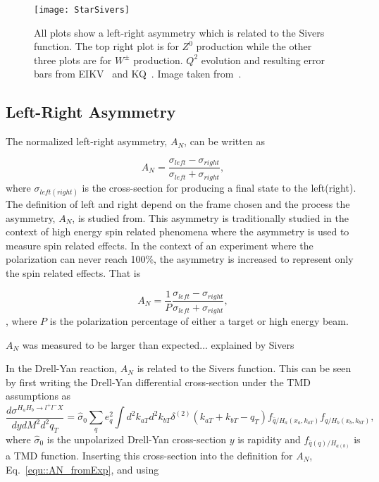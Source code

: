 \begin{figure}[h!t]
  \centering
  \texttt{[image: StarSivers]}
  \caption{All plots show a left-right asymmetry which is related to the Sivers
    function.  The top right plot is for $Z^0$ production while the other three
    plots are for $W^\pm$ production.  $Q^2$ evolution and resulting error bars
    from EIKV~\cite{PhysRevD.89.074013} and KQ~\cite{PhysRevLett.103.172001}.
    Image taken from~\cite{PhysRevLett.116.132301}.}
  \label{fig::StarSivers}
\end{figure}

\subsection{Left-Right Asymmetry}
The normalized left-right asymmetry, $A_N$, can be written as

\begin{equation}
  A_N = \frac{\sigma_{left} - \sigma_{right}}{\sigma_{left} + \sigma_{right}},
\end{equation}
\noindent
where $\sigma_{left(right)}$ is the cross-section for producing a final state to
the left(right).  The definition of left and right depend on the frame chosen
and the process the asymmetry, $A_N$, is studied from.  This asymmetry is
traditionally studied in the context of high energy spin related phenomena where
the asymmetry is used to measure spin related effects.  In the context of an
experiment where the polarization can never reach 100\%, the asymmetry is
increased to represent only the spin related effects.  That is

\begin{equation}
  \label{equ::QN_fromExp}
  A_N = \frac{1}{P}
  \frac{\sigma_{left} - \sigma_{right}}{\sigma_{left} + \sigma_{right}},
\end{equation},
\noindent
where $P$ is the polarization percentage of either a target or high energy beam.

$A_N$ was measured to be larger than expected... explained by Sivers

In the Drell-Yan reaction, $A_N$ is related to the Sivers function.  This can be
seen by first writing the Drell-Yan differential cross-section under the TMD
assumptions as~\cite{}
\begin{equation}
  \frac{d\sigma^{H_aH_b\rightarrow l^+l^- X}}{dydM^2d^2q_T} =
  \hat{\sigma}_0 \sum_q e^2_q \int d^2k_{aT} d^2k_{bT}
  \delta^{(2)}(k_{aT}+k_{bT}-q_T)
  f_{\bar{q}/H_a(x_a, k_{aT})}f_{q/H_b(x_b, k_{bT})},
\end{equation}
\noindent
where $\hat{\sigma}_0$ is the unpolarized Drell-Yan cross-section $y$ is
rapidity and $f_{\bar{q}(q)/H_{a(b)}}$ is a TMD function.  Inserting this
cross-section into the definition for $A_N$, Eq.~\ref{equ::AN_fromExp}, and
using

